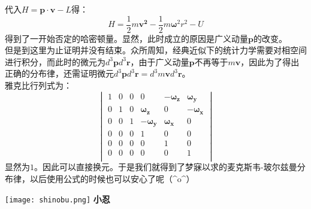 \documentclass[utf8]{ctexart}
\begin{document}
代入$H=\boldsymbol{p}\cdot\boldsymbol{v}-L$得：
$$
H=\frac{1}{2}m\boldsymbol{v^2}-\frac{1}{2}m\boldsymbol{\omega} ^{2}r^2-U
$$
得到了一开始否定的哈密顿量。显然，此时成立的原因是广义动量$\boldsymbol{p}$的改变。\\
但是到这里为止证明并没有结束。众所周知，经典近似下的统计力学需要对相空间进行积分，而此时的微元为$d^3\boldsymbol{p}d^3\boldsymbol{r}$，由于广义动量$\boldsymbol{p}$不再等于$m\boldsymbol{v}$，因此为了得出正确的分布律，还需证明微元$d^3\boldsymbol{p}d^3\boldsymbol{r}=d^3m\boldsymbol{v}d^3\boldsymbol{r}$。\\
雅克比行列式为：
$$
\begin{vmatrix}
	1  &0  &0  &0&-\boldsymbol{\omega_{z}}&\boldsymbol{\omega_{y}}\\
	0  &1  &0  &\boldsymbol{\omega_{z}}&0&-\boldsymbol{\omega_{x}}\\
	0  &0  &1  &-\boldsymbol{\omega_{y}}&\boldsymbol{\omega_{x}}&0\\
	0  &0  &0  &1&0&0\\
	0  &0  &0  &0&1&0\\
	0  &0  &0  &0&0&1\\
\end{vmatrix}
$$
显然为$1$。因此可以直接换元。于是我们就得到了梦寐以求的麦克斯韦-玻尔兹曼分布律，以后使用公式的时候也可以安心了呢（\^{}o\^{}）
\begin{center}
	\texttt{[image: shinobu.png]}
	\textbf{小忍}
\end{center}
\end{document}
